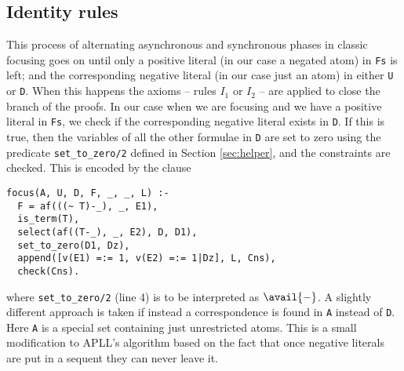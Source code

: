 \subsection{Identity rules}\label{sec:identity}
This process of alternating asynchronous and synchronous phases in classic focusing goes on until only a positive literal (in our case a negated atom) in \texttt{Fs} is left; and the corresponding negative literal (in our case just an atom) in either \texttt{U} or \texttt{D}.
When this happens the axioms -- rules $I_1$ or $I_2$ -- are applied to close the branch of the proofs.
In our case when we are focusing and we have a positive literal in \texttt{Fs}, we check if the corresponding negative literal exists in \texttt{D}.
If this is true, then the variables of all the other formulae in \texttt{D} are set to zero using the predicate \texttt{set\_to\_zero/2} defined in Section \ref{sec:helper}, and the constraints are checked.
This is encoded by the clause 
\begin{verbatim}
focus(A, U, D, F, _, _, L) :-
  F = af(((~ T)-_), _, E1),
  is_term(T),
  select(af((T-_), _, E2), D, D1),
  set_to_zero(D1, Dz),
  append([v(E1) =:= 1, v(E2) =:= 1|Dz], L, Cns),
  check(Cns).
\end{verbatim}
where \texttt{set\_to\_zero/2} (line 4) is to be interpreted as $\avail{-}$.
A slightly different approach is taken if instead a correspondence is found in \texttt{A} instead of \texttt{D}.
Here \texttt{A} is a special set containing just unrestricted atoms.
This is a small modification to APLL's algorithm based on the fact that once negative literals are put in a sequent they can never leave it.

